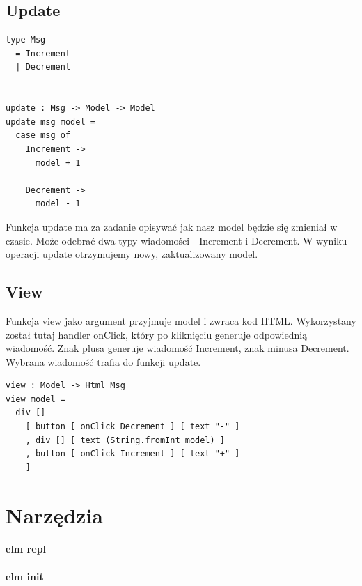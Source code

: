 \documentclass[twoside,a4paper]{report}
\begin{document}
\subsection{Update}
\begin{minipage}{.45\textwidth}
\lstset{frame=single}
\begin{lstlisting}[caption={\textit{The Elm Architecture} - Update},label=kod:Update]
type Msg
  = Increment
  | Decrement


update : Msg -> Model -> Model
update msg model =
  case msg of
    Increment ->
      model + 1

    Decrement ->
      model - 1
\end{lstlisting}
\end{minipage}\hfill
\begin{minipage}{.45\textwidth}
Funkcja update ma za zadanie opisywać jak nasz model będzie się zmieniał w czasie. Może odebrać dwa typy wiadomości - Increment i Decrement. W wyniku operacji update otrzymujemy nowy, zaktualizowany model.
\end{minipage}\hfill
\subsection{View}
Funkcja view jako argument przyjmuje model i zwraca kod HTML. Wykorzystany został tutaj handler onClick, który po kliknięciu generuje odpowiednią wiadomość. Znak plusa generuje wiadomość Increment, znak minusa Decrement. Wybrana wiadomość trafia do funkcji update.

\lstset{frame=single}
\begin{lstlisting}[caption={\textit{The Elm Architecture} - View},label=kod:View]
view : Model -> Html Msg
view model =
  div []
    [ button [ onClick Decrement ] [ text "-" ]
    , div [] [ text (String.fromInt model) ]
    , button [ onClick Increment ] [ text "+" ]
    ]
\end{lstlisting}

\section{Narzędzia}

\paragraph{elm repl}

\paragraph{elm init}
\end{document}
